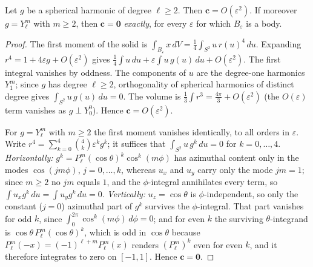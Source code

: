 \documentclass[10pt,a4paper]{amsart}
\begin{document}
\begin{lemma}[Centroid]\label{lem:centroid}
Let $g$ be a spherical harmonic of degree $\ell\ge2$. Then $\mathbf{c}=O(\varepsilon^2)$. If moreover
$g=Y_\ell^m$ with $m\ge2$, then $\mathbf{c}=\mathbf{0}$ \emph{exactly}, for every $\varepsilon$ for which
$B_\varepsilon$ is a body.
\end{lemma}

\begin{proof}
The first moment of the solid is $\int_{B_\varepsilon}x\,dV=\tfrac14\int_{S^2}u\,r(u)^4\,du$. Expanding
$r^4=1+4\varepsilon g+O(\varepsilon^2)$ gives
$\tfrac14\!\int u\,du + \varepsilon\!\int u\,g(u)\,du + O(\varepsilon^2)$. The first integral vanishes by
oddness. The components of $u$ are the degree-one harmonics $Y_1^{m}$; since $g$ has degree $\ell\ge2$,
orthogonality of spherical harmonics of distinct degree gives $\int_{S^2}u\,g(u)\,du=0$. The volume is
$\tfrac13\int r^3=\tfrac{4\pi}{3}+O(\varepsilon^2)$ (the $O(\varepsilon)$ term vanishes as $g\perp Y_0^0$).
Hence $\mathbf{c}=O(\varepsilon^2)$.

For $g=Y_\ell^m$ with $m\ge2$ the first moment vanishes identically, to all orders in $\varepsilon$. Write
$r^4=\sum_{k=0}^{4}\binom{4}{k}\varepsilon^k g^k$; it suffices that $\int_{S^2}u\,g^k\,du=0$ for
$k=0,\dots,4$. \emph{Horizontally:} $g^k=P_\ell^m(\cos\theta)^k\cos^k(m\phi)$ has azimuthal content only in
the modes $\cos(jm\phi)$, $j=0,\dots,k$, whereas $u_x$ and $u_y$ carry only the mode $j m=1$; since $m\ge2$
no $jm$ equals $1$, and the $\phi$-integral annihilates every term, so
$\int u_x g^k\,du=\int u_y g^k\,du=0$. \emph{Vertically:} $u_z=\cos\theta$ is $\phi$-independent, so only the
constant ($j=0$) azimuthal part of $g^k$ survives the $\phi$-integral. That part vanishes for odd $k$, since
$\int_0^{2\pi}\cos^k(m\phi)\,d\phi=0$; and for even $k$ the surviving $\theta$-integrand is
$\cos\theta\,P_\ell^m(\cos\theta)^k$, which is odd in $\cos\theta$ because $P_\ell^m(-x)=(-1)^{\ell+m}
P_\ell^m(x)$ renders $(P_\ell^m)^k$ even for even $k$, and it therefore integrates to zero on $[-1,1]$.
Hence $\mathbf{c}=\mathbf{0}$.
\end{proof}
\end{document}
